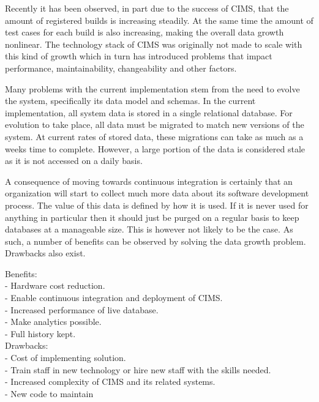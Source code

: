 Recently it has been observed, in part due to the success of CIMS, that the amount of registered builds is increasing steadily. At the same time the amount of test cases for each build is also increasing, making the overall data growth nonlinear. The technology stack of CIMS was originally not made to scale with this kind of growth which in turn has introduced problems that impact performance, maintainability, changeability and other factors.

Many problems with the current implementation stem from the need to evolve the system, specifically its data model and schemas. In the current implementation, all system data is stored in a single relational database. For evolution to take place, all data must be migrated to match new versions of the system. At current rates of stored data, these migrations can take as much as a weeks time to complete. However, a large portion of the data is considered stale as it is not accessed on a daily basis.

A consequence of moving towards continuous integration is certainly that an organization will start to collect much more data about its software development process. The value of this data is defined by how it is used. If it is never used for anything in particular then it should just be purged on a regular basis to keep databases at a manageable size. This is however not likely to be the case. As such, a number of benefits can be observed by solving the data growth problem. Drawbacks also exist.

Benefits: \\
- Hardware cost reduction.\\
- Enable continuous integration and deployment of CIMS.\\
- Increased performance of live database.\\
- Make analytics possible.\\
- Full history kept.\\

Drawbacks:\\
- Cost of implementing solution.\\
- Train staff in new technology or hire new staff with the skills needed.\\
- Increased complexity of CIMS and its related systems.\\
- New code to maintain\\

